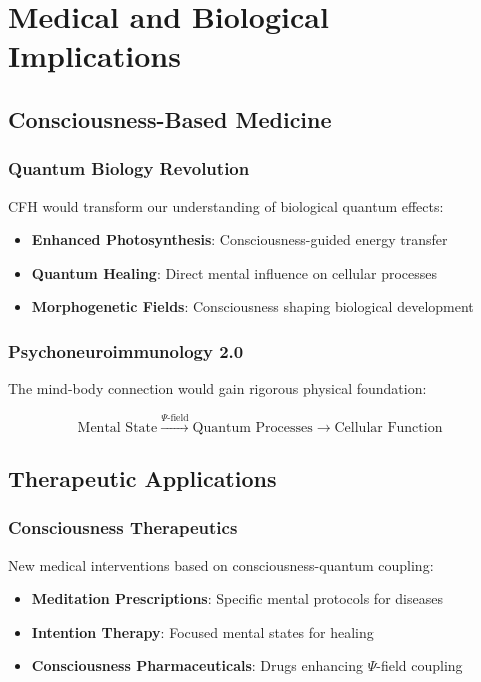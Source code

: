 \documentclass[12pt,article]{memoir}
\begin{document}
\chapter{Medical and Biological Implications}

\section{Consciousness-Based Medicine}

\subsection{Quantum Biology Revolution}

CFH would transform our understanding of biological quantum effects:

\begin{itemize}
    \item \textbf{Enhanced Photosynthesis}: Consciousness-guided energy transfer
    \item \textbf{Quantum Healing}: Direct mental influence on cellular processes
    \item \textbf{Morphogenetic Fields}: Consciousness shaping biological development
\end{itemize}

\subsection{Psychoneuroimmunology 2.0}

The mind-body connection would gain rigorous physical foundation:

\begin{equation}
\text{Mental State} \xrightarrow{\Psi\text{-field}} \text{Quantum Processes} \xrightarrow{} \text{Cellular Function}
\end{equation}

\section{Therapeutic Applications}

\subsection{Consciousness Therapeutics}

New medical interventions based on consciousness-quantum coupling:

\begin{itemize}
    \item \textbf{Meditation Prescriptions}: Specific mental protocols for diseases
    \item \textbf{Intention Therapy}: Focused mental states for healing
    \item \textbf{Consciousness Pharmaceuticals}: Drugs enhancing $\Psi$-field coupling
\end{itemize}
\end{document}
